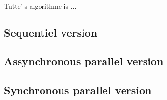 Tutte' s algorithme is ...

\subsection{Sequentiel version}

\subsection{Assynchronous parallel version}



\subsection{Synchronous parallel version}

